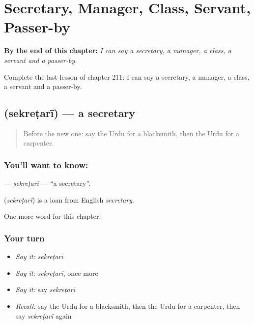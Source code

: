 
\chapter{Secretary, Manager, Class, Servant, Passer-by}
\label{ch:ur-secretary-manager-class-servant-passer-by}

\begin{chapteropening}
\textbf{By the end of this chapter:} \emph{I can say a secretary, a manager, a class, a servant and a passer-by.}

Complete the last lesson of chapter 211: I can say a secretary, a manager, a class, a servant and a passer-by.
\end{chapteropening}

\section[\texorpdfstring{\ur{سیکرٹری} (sekreṭarī)}{سیکرٹری (sekreṭarī)}]{ (sekreṭarī) — a secretary}

\label{lesson:UR-C211-sekretari}



\begin{quote}
Before the new one: say the Urdu for a blacksmith, then the Urdu for a carpenter.
\end{quote}

\subsection*{You'll want to know: }
\textbf{} — \emph{sekreṭarī} — \textquotedblleft{}a secretary\textquotedblright{}.

\begin{cousinweb}
\textbf{} (\emph{sekreṭarī}) is a loan from English \emph{secretary}.
\end{cousinweb}

\begin{grammarlens}[title={What you've built}]
One more word for this chapter.
\end{grammarlens}

\subsection*{Your turn}
\begin{itemize}
\raggedright
  \item \emph{Say it:} \emph{sekreṭarī}
  \item \emph{Say it:} \emph{sekreṭarī}, once more
  \item \emph{Say it:} say \emph{sekreṭarī}
  \item \emph{Recall:} say the Urdu for a blacksmith, then the Urdu for a carpenter, then say \emph{sekreṭarī} again
\end{itemize}


